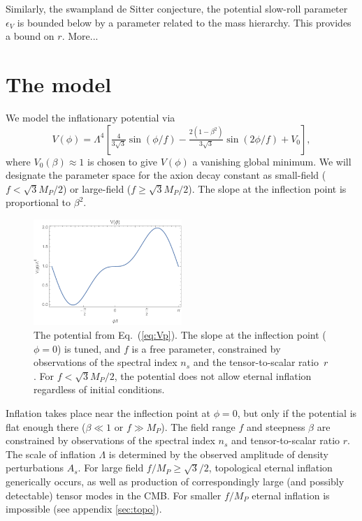 \documentclass[aps,amsfonts,amsmath,prd,preprint,nofootinbib,superscriptaddress]{revtex4}
\newcommand{\Mp}{{M_{P}}}
\newcommand{\MMp}{{M_P^2}}
\newcommand{\beq}{\begin{equation}}
\newcommand{\eeq}{\end{equation}}
\begin{document}
Similarly, the swampland de Sitter conjecture, the potential slow-roll parameter $\epsilon_V$ is bounded below by a parameter related to the mass hierarchy.
This provides  \cite{Dias:2018ngv} a bound on $r$. More...


\section{The model}
 We model the inflationary potential via
\beq
V(\phi) = \Lambda^4\left[\tfrac{4}{3\sqrt{3}}\sin(\phi/f) -\tfrac{2(1 - \beta^2)}{3\sqrt{3}} \sin(2\phi/f) + V_0  \right], \label{eq:Vp}
\eeq
where $V_0(\beta) \approx 1$ is chosen to give $V(\phi)$ a vanishing global minimum.
We will designate the parameter space for the axion decay constant as small-field ($f < \sqrt{3}\Mp/2$) or large-field ($f \geq \sqrt{3}\Mp/2$). %
The slope at the inflection point is proportional to $\beta^2$.

\begin{figure}[!h]
  \centering
    \includegraphics[width=0.5\textwidth]{figures/V.pdf}
    \caption{The potential from Eq.~(\ref{eq:Vp}).  The slope at the inflection point ($\phi = 0$) is tuned, and $f$ is a free parameter, constrained by 
    observations of the spectral index $n_s$ and the tensor-to-scalar ratio~$r$.  For $f < \sqrt{3}\Mp/2$, the potential does not allow eternal inflation regardless of initial conditions.}
\end{figure}


Inflation takes place near the inflection point at $\phi = 0$, but only if the potential is flat enough there ($\beta \ll 1$ or $f \gg \Mp$).
The field range $f$ and steepness $\beta$ are constrained by observations of the spectral index $n_s$ and tensor-to-scalar 
ratio $r$.   The scale of inflation $\Lambda$ is determined by the observed amplitude of density perturbations $A_s$.
 For large field $f/\Mp \geq \sqrt{3}/2$, topological eternal inflation generically occurs, as well as production of correspondingly large (and possibly detectable) tensor modes in the CMB.   
 For smaller $f/\Mp$ eternal inflation is impossible (see appendix \ref{sec:topo}).
\end{document}
